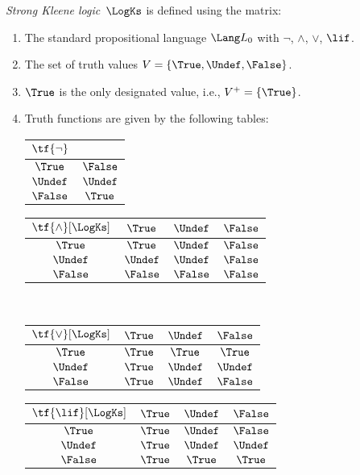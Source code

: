 \documentclass[../../../include/open-logic-section]{subfiles}
\begin{document}
\begin{defn}
\emph{Strong Kleene logic}~$\LogKs$ is defined using the matrix:
\begin{enumerate}
  \item The standard propositional language $\Lang L_0$ with
  $\lnot$, $\land$, $\lor$, $\lif$.
  \item The set of truth values $V = \{\True, \Undef, \False\}$.
  \item $\True$ is the only designated value, i.e., $V^+ = \{\True\}$.
  \item Truth functions are given by the following tables:
  \begin{center}
    \begin{tabular}{c|c} 
      $\tf{\lnot}$ & \\ 
      \hline  
      $\True$ & $\False$ \\ 
      $\Undef$ & $\Undef$ \\
      $\False$ & $\True$ 
    \end{tabular}
    \quad
    \begin{tabular}{c|ccc} 
      $\tf{\land}[\LogKs]$ & $\True$ & $\Undef$ & $\False$ \\ 
      \hline 
      $\True$ & $\True$ & $\Undef$ & $\False$ \\ 
      $\Undef$ & $\Undef$ & $\Undef$ & $\False$\\ 
      $\False$ & $\False$ & $\False$ & $\False$ 
    \end{tabular}
    \\[2ex]
    \begin{tabular}{c|ccc} 
      $\tf{\lor}[\LogKs]$ & $\True$ & $\Undef$ & $\False$ \\ 
      \hline 
      $\True$ & $\True$ & $\True$ & $\True$ \\ 
      $\Undef$ & $\True$ & $\Undef$ & $\Undef$ \\
      $\False$ & $\True$ & $\Undef$ & $\False$ 
    \end{tabular}
    \quad
    \begin{tabular}{c|ccc} 
      $\tf{\lif}[\LogKs]$ & $\True$ & $\Undef$ & $\False$ \\ 
      \hline 
      $\True$ & $\True$ & $\Undef$ & $\False$ \\ 
      $\Undef$ & $\True$ & $\Undef$ & $\Undef$  \\ 
      $\False$ & $\True$ & $\True$ & $\True$ 
    \end{tabular}
  \end{center} 
\end{enumerate}
\end{defn}
\end{document}
